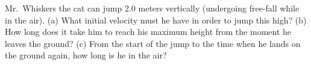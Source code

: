 %
Mr.~Whiskers the cat can jump 2.0 meters vertically (undergoing
free-fall while in the air).
%
(a) What initial velocity must he have in order to jump this
high?\answercheck\hwendpart
%
(b) How long does it take him to reach his maximum height from the
moment he leaves the ground?\answercheck\hwendpart
%
(c) From the start of the jump to the time when he lands on the
ground again, how long is he in the air?\answercheck
